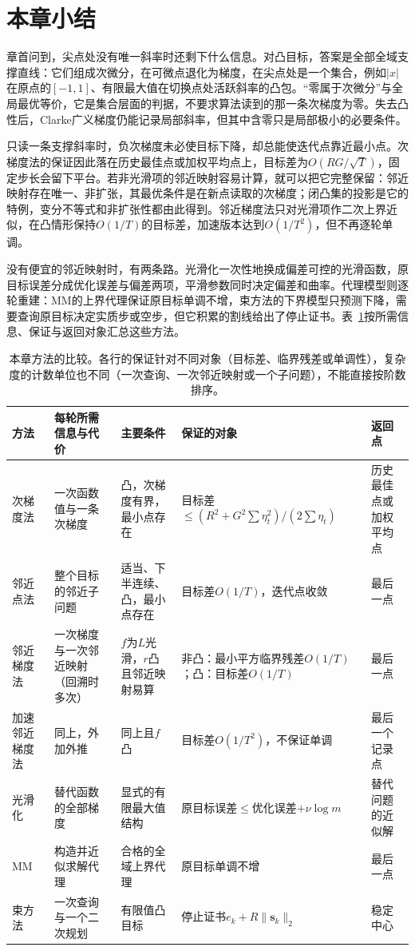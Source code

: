 \section{本章小结}
\label{sec:opt-ns-summary}

章首问到，尖点处没有唯一斜率时还剩下什么信息。对凸目标，答案是全部全域支撑直线：它们组成次微分，在可微点退化为梯度，在尖点处是一个集合，例如$|x|$在原点的$[-1,1]$、有限最大值在切换点处活跃斜率的凸包。“零属于次微分”与全局最优等价，它是集合层面的判据，不要求算法读到的那一条次梯度为零。失去凸性后，Clarke广义梯度仍能记录局部斜率，但其中含零只是局部极小的必要条件。

只读一条支撑斜率时，负次梯度未必使目标下降，却总能使迭代点靠近最小点。次梯度法的保证因此落在历史最佳点或加权平均点上，目标差为$O(RG/\sqrt T)$，固定步长会留下平台。若非光滑项的邻近映射容易计算，就可以把它完整保留：邻近映射存在唯一、非扩张，其最优条件是在新点读取的次梯度；闭凸集的投影是它的特例，变分不等式和非扩张性都由此得到。邻近梯度法只对光滑项作二次上界近似，在凸情形保持$O(1/T)$的目标差，加速版本达到$O(1/T^2)$，但不再逐轮单调。

没有便宜的邻近映射时，有两条路。光滑化一次性地换成偏差可控的光滑函数，原目标误差分成优化误差与偏差两项，平滑参数同时决定偏差和曲率。代理模型则逐轮重建：MM的上界代理保证原目标单调不增，束方法的下界模型只预测下降，需要查询原目标决定实质步或空步，但它积累的割线给出了停止证书。表~\ref{tab:opt-ns-method-summary}按所需信息、保证与返回对象汇总这些方法。

\begin{table}[!htbp]
  \centering
  \small
  \begin{tabularx}{\linewidth}{@{}l>{\raggedright\arraybackslash}X>{\raggedright\arraybackslash}X>{\raggedright\arraybackslash}X>{\raggedright\arraybackslash}X@{}}
    \toprule
    方法 & 每轮所需信息与代价 & 主要条件 & 保证的对象 & 返回点 \\
    \midrule
    次梯度法 & 一次函数值与一条次梯度 & 凸，次梯度有界，最小点存在 & 目标差$\leq(R^2+G^2\sum\eta_t^2)/(2\sum\eta_t)$ & 历史最佳点或加权平均点 \\
    邻近点法 & 整个目标的邻近子问题 & 适当、下半连续、凸，最小点存在 & 目标差$O(1/T)$，迭代点收敛 & 最后一点 \\
    邻近梯度法 & 一次梯度与一次邻近映射（回溯时多次） & $f$为$L$光滑，$r$凸且邻近映射易算 & 非凸：最小平方临界残差$O(1/T)$；凸：目标差$O(1/T)$ & 最后一点 \\
    加速邻近梯度法 & 同上，外加外推 & 同上且$f$凸 & 目标差$O(1/T^2)$，不保证单调 & 最后一个记录点 \\
    光滑化 & 替代函数的全部梯度 & 显式的有限最大值结构 & 原目标误差$\leq$优化误差$+\nu\log m$ & 替代问题的近似解 \\
    MM & 构造并近似求解代理 & 合格的全域上界代理 & 原目标单调不增 & 最后一点 \\
    束方法 & 一次查询与一个二次规划 & 有限值凸目标 & 停止证书$e_k+R\lVert\bm s_k\rVert_2$ & 稳定中心 \\
    \bottomrule
  \end{tabularx}
  \caption{本章方法的比较。各行的保证针对不同对象（目标差、临界残差或单调性），复杂度的计数单位也不同（一次查询、一次邻近映射或一个子问题），不能直接按阶数排序。}
  \label{tab:opt-ns-method-summary}
\end{table}

